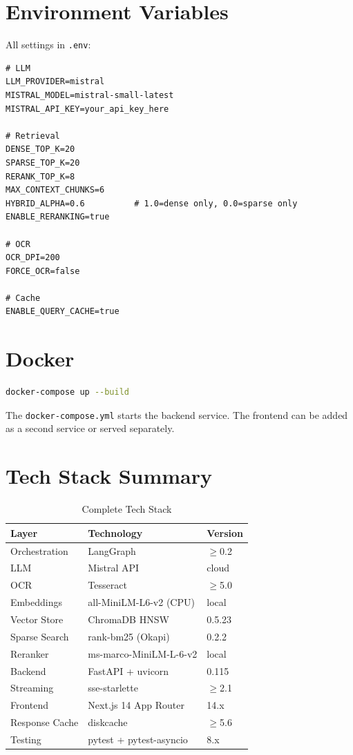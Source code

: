 \documentclass[12pt,a4paper]{report}
\begin{document}
\section{Environment Variables}

All settings in \texttt{.env}:

\begin{lstlisting}[caption={.env key settings}]
# LLM
LLM_PROVIDER=mistral
MISTRAL_MODEL=mistral-small-latest
MISTRAL_API_KEY=your_api_key_here

# Retrieval
DENSE_TOP_K=20
SPARSE_TOP_K=20
RERANK_TOP_K=8
MAX_CONTEXT_CHUNKS=6
HYBRID_ALPHA=0.6          # 1.0=dense only, 0.0=sparse only
ENABLE_RERANKING=true

# OCR
OCR_DPI=200
FORCE_OCR=false

# Cache
ENABLE_QUERY_CACHE=true
\end{lstlisting}

\section{Docker}

\begin{lstlisting}[language=bash]
docker-compose up --build
\end{lstlisting}

The \texttt{docker-compose.yml} starts the backend service. The frontend can be added as a second service or served separately.

\section{Tech Stack Summary}

\begin{table}[H]
\centering
\caption{Complete Tech Stack}
\begin{tabular}{@{}lll@{}}
\toprule
\textbf{Layer} & \textbf{Technology} & \textbf{Version} \\
\midrule
Orchestration & LangGraph & $\geq$0.2 \\
LLM & Mistral API & cloud \\
OCR & Tesseract & $\geq$5.0 \\
Embeddings & all-MiniLM-L6-v2 (CPU) & local \\
Vector Store & ChromaDB HNSW & 0.5.23 \\
Sparse Search & rank-bm25 (Okapi) & 0.2.2 \\
Reranker & ms-marco-MiniLM-L-6-v2 & local \\
Backend & FastAPI + uvicorn & 0.115 \\
Streaming & sse-starlette & $\geq$2.1 \\
Frontend & Next.js 14 App Router & 14.x \\
Response Cache & diskcache & $\geq$5.6 \\
Testing & pytest + pytest-asyncio & 8.x \\
\bottomrule
\end{tabular}
\end{table}
\end{document}

